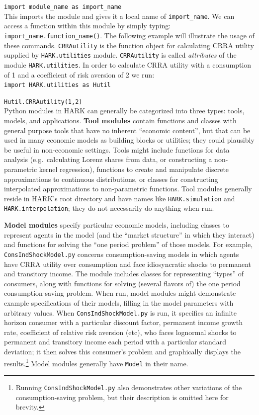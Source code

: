 \documentclass[12pt,titlepage,letterpaper]{econtex}
\begin{document}
{\texttt{import module\_name as import\_name}
\\

\noindent
This imports the module and gives it a local name of \texttt{import\_name}. We can access a function within this module by simply typing: \texttt{import\_name.function\_name()}. The following example will illustrate the usage of these commands. \texttt{CRRAutility} is the function object for calculating CRRA utility supplied by \texttt{HARK.utilities} module. \texttt{CRRAutility} is called \textit{attributes} of the module  \texttt{HARK.utilities}. In order to calculate CRRA utility with a consumption of 1 and a coefficient of risk aversion of 2 we run:\\

\texttt{import HARK.utilities as Hutil}

\texttt{Hutil.CRRAutility(1,2)}\\

Python modules in HARK can generally be categorized into three types: tools, models, and applications.  \textbf{Tool modules} contain functions and classes with general purpose tools that have no inherent ``economic content'', but that can be used in many economic models as building blocks or utilities; they could plausibly be useful in non-economic settings.  Tools might include functions for data analysis (e.g.\ calculating Lorenz shares from data, or constructing a non-parametric kernel regression), functions to create and manipulate discrete approximations to continuous distributions, or classes for constructing interpolated approximations to non-parametric functions.  Tool modules generally reside in HARK's root directory and have names like \texttt{HARK.simulation} and \texttt{HARK.interpolation}; they do not necessarily do anything when run.

\textbf{Model modules} specify particular economic models, including classes to represent agents in the model (and the ``market structure'' in which they interact) and functions for solving the ``one period problem'' of those models.  For example, \texttt{ConsIndShockModel.py} concerns consumption-saving models in which agents have CRRA utility over consumption and face idiosyncratic shocks to permanent and transitory income.  The module includes classes for representing ``types'' of consumers, along with functions for solving (several flavors of) the one period consumption-saving problem.  When run, model modules might demonstrate example specifications of their models, filling in the model parameters with arbitrary values.  When \texttt{ConsIndShockModel.py} is run, it specifies an infinite horizon consumer with a particular discount factor, permanent income growth rate, coefficient of relative risk aversion (etc), who faces lognormal shocks to permanent and transitory income each period with a particular standard deviation; it then solves this consumer's problem and graphically displays the results.\footnote{Running \texttt{ConsIndShockModel.py} also demonstrates other variations of the consumption-saving problem, but their description is omitted here for brevity.}  Model modules generally have \texttt{Model} in their name.

}
\end{document}
